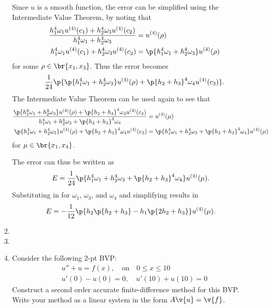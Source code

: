 \documentclass[11pt, oneside]{article}
\begin{document}
\begin{enumerate}
        Since $u$ is a smooth function, the error can be simplified using the
        Intermediate Value Theorem, by noting that
        \begin{align*}
            \frac{h_1^4 \omega_1 u^{(4)}(c_1) + h_2^4 \omega_3 u^{(4)}(c_2)}{h_1^4 \omega_1 + h_2^4 \omega_3} &= u^{(4)}(\rho) \\
            h_1^4 \omega_1 u^{(4)}(c_1) + h_2^4 \omega_3 u^{(4)}(c_2) &= \p{h_1^4 \omega_1 + h_2^4 \omega_3} u^{(4)}(\rho)
        \end{align*}
        for some $\rho \in \br{x_1, x_3}$.
        Thus the error becomes
        \begin{align*}
            \frac{1}{24}\p{\p{h_1^4 \omega_1 + h_2^4 \omega_3}u^{(4)}(\rho)+ \p{h_2 + h_3}^4 \omega_4 u^{(4)}(c_3)}.
        \end{align*}
        The Intermediate Value Theorem can be used again to see that
        \begin{align*}
            \frac{\p{h_1^4 \omega_1 + h_2^4 \omega_3}u^{(4)}(\rho)+ \p{h_2 + h_3}^4 \omega_4 u^{(4)}(c_3)}{h_1^4 \omega_1 + h_2^4 \omega_3 + \p{h_2 + h_3}^4 \omega_4} &= u^{(4)}(\mu) \\
            \p{h_1^4 \omega_1 + h_2^4 \omega_3}u^{(4)}(\rho)+ \p{h_2 + h_3}^4 \omega_4 u^{(4)}(c_3) &= \p{h_1^4 \omega_1 + h_2^4 \omega_3 + \p{h_2 + h_3}^4 \omega_4} u^{(4)}(\mu)
        \end{align*}
        for $\mu \in \br{x_1, x_4}$.

        The error can thus be written as
        \begin{align*}
            E &= \frac{1}{24}\p{h_1^4 \omega_1 + h_2^4 \omega_3 + \p{h_2 + h_3}^4 \omega_4} u^{(4)}(\mu).
        \end{align*}
        Substituting in for $\omega_1$, $\omega_3$, and $\omega_4$ and
        simplifying results in
        \begin{align*}
            E &= -\frac{1}{12} \p{h_2\p{h_2 + h_3} - h_1 \p{2 h_2 + h_3}} u^{(4)}(\mu).
        \end{align*}

    \item %
    \item %

    \item %
        Consider the following 2-pt BVP:
        \begin{align*}
            u'' + u = f(x), \quad \text{on} \quad 0 \le x \le 10 \\
            u'(0) - u(0) = 0, \quad u'(10) + u(10) = 0
        \end{align*}
        Construct a second order accurate finite-difference method for this BVP.
        Write your method as a linear system in the form $A \v{u} = \v{f}$.


\end{enumerate}
\end{document}
